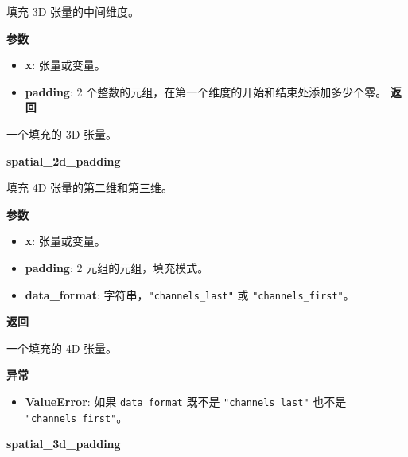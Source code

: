 填充 3D 张量的中间维度。

\textbf{参数}

\begin{itemize}
\tightlist
\item
  \textbf{x}: 张量或变量。
\item
  \textbf{padding}: 2
  个整数的元组，在第一个维度的开始和结束处添加多少个零。 \textbf{返回}
\end{itemize}

一个填充的 3D 张量。


\textbf{spatial\_2d\_padding}\label{spatialux5f2dux5fpadding}

\begin{Shaded}
\begin{Highlighting}[]
\OperatorTok{=}\NormalTok{((}\NormalTok{, }\NormalTok{), (}\NormalTok{, }\OperatorTok{=}\NormalTok{)}
\end{Highlighting}
\end{Shaded}

填充 4D 张量的第二维和第三维。

\textbf{参数}

\begin{itemize}
\tightlist
\item
  \textbf{x}: 张量或变量。
\item
  \textbf{padding}: 2 元组的元组，填充模式。
\item
  \textbf{data\_format}: 字符串，\texttt{"channels\_last"} 或
  \texttt{"channels\_first"}。
\end{itemize}

\textbf{返回}

一个填充的 4D 张量。

\textbf{异常}

\begin{itemize}
\tightlist
\item
  \textbf{ValueError}: 如果 \texttt{data\_format} 既不是
  \texttt{"channels\_last"} 也不是 \texttt{"channels\_first"}。
\end{itemize}


\textbf{spatial\_3d\_padding}\label{spatialux5f3dux5fpadding}

\begin{Shaded}
\begin{Highlighting}[]
\OperatorTok{=}\NormalTok{((}\NormalTok{, }\NormalTok{), (}\NormalTok{, }\NormalTok{), (}\NormalTok{, }\OperatorTok{=}\NormalTok{)}
\end{Highlighting}
\end{Shaded}

